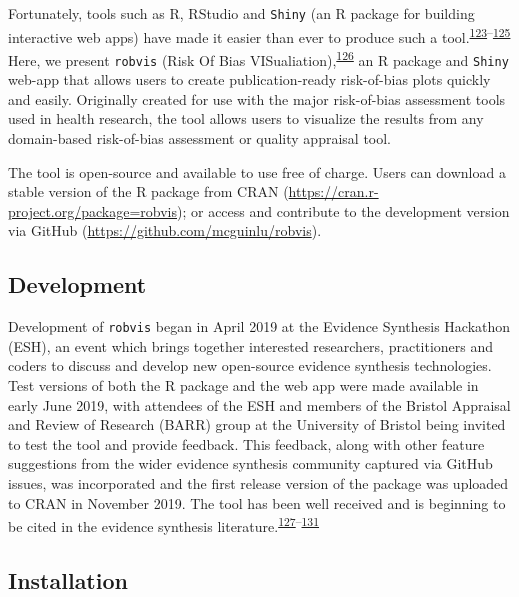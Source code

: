 \documentclass[a4paper, twoside]{templates/ociamthesis}
\begin{document}
Fortunately, tools such as R, RStudio and \texttt{Shiny} (an R package for building interactive web apps) have made it easier than ever to produce such a tool.\textsuperscript{\protect\hyperlink{ref-rref}{123}--\protect\hyperlink{ref-shinyref}{125}} Here, we present \texttt{robvis} (Risk Of Bias VISualiation),\textsuperscript{\protect\hyperlink{ref-mcguinness2019a}{126}} an R package and \texttt{Shiny} web-app that allows users to create publication-ready risk-of-bias plots quickly and easily. Originally created for use with the major risk-of-bias assessment tools used in health research, the tool allows users to visualize the results from any domain-based risk-of-bias assessment or quality appraisal tool.

The tool is open-source and available to use free of charge. Users can download a stable version of the R package from CRAN (\url{https://cran.r-project.org/package=robvis}); or access and contribute to the development version via GitHub (\url{https://github.com/mcguinlu/robvis}).

\hypertarget{development-1}{%
\subsection{Development}\label{development-1}}

Development of \texttt{robvis} began in April 2019 at the Evidence Synthesis Hackathon (ESH), an event which brings together interested researchers, practitioners and coders to discuss and develop new open-source evidence synthesis technologies. Test versions of both the R package and the web app were made available in early June 2019, with attendees of the ESH and members of the Bristol Appraisal and Review of Research (BARR) group at the University of Bristol being invited to test the tool and provide feedback. This feedback, along with other feature suggestions from the wider evidence synthesis community captured via GitHub issues, was incorporated and the first release version of the package was uploaded to CRAN in November 2019. The tool has been well received and is beginning to be cited in the evidence synthesis literature.\textsuperscript{\protect\hyperlink{ref-gibb2019consistent}{127}--\protect\hyperlink{ref-tanneru2020}{131}}

\hypertarget{installation-1}{%
\subsection{Installation}\label{installation-1}}
\end{document}
